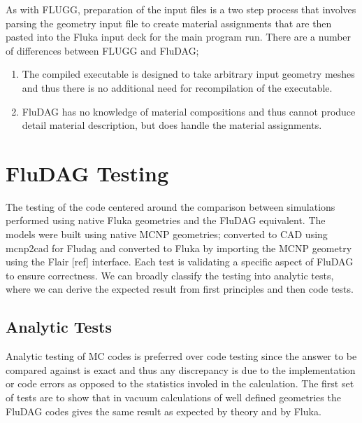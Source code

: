 \documentclass{anstrans}
\begin{document}
As with FLUGG, preparation of the input files is a two step process
that involves parsing the geometry input file to create material
assignments that are then pasted into the Fluka input deck for the main
program run.  There are a number of differences between FLUGG and FluDAG;
\begin{enumerate}
\item{The compiled executable is designed to take arbitrary input geometry meshes 
and thus there is no additional need for recompilation of the executable.}
\item{FluDAG has no knowledge of material compositions and thus cannot produce
detail material description, but does handle the material assignments.}
\end{enumerate}

\section{FluDAG Testing}
The testing of the code centered around the comparison between
simulations performed using native Fluka geometries and the FluDAG
equivalent. The models were built using native MCNP geometries;
converted to CAD using mcnp2cad for Fludag and converted to Fluka by
importing the MCNP geometry using the Flair [ref] interface. Each test
is validating a specific aspect of FluDAG to ensure correctness. We
can broadly classify the testing into analytic tests, where we can
derive the expected result from first principles and then code tests.

\subsection{Analytic Tests}
Analytic testing of MC codes is preferred over code testing since the
answer to be compared against is exact and thus any discrepancy is due
to the implementation or code errors as opposed to the statistics
involed in the calculation. The first set of tests are to show that in
vacuum calculations of well defined geometries the FluDAG codes gives
the same result as expected by theory and by Fluka.
\end{document}
